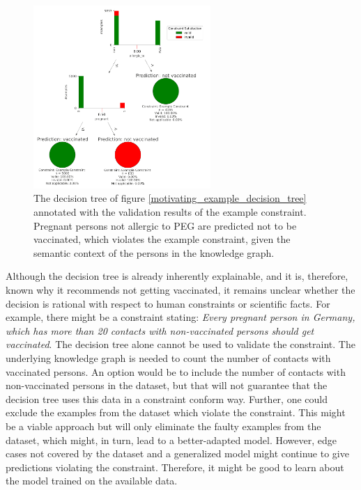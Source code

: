     \begin{figure}
            \centering
            \includegraphics[width=0.6\textwidth]{images/motivating_example/Annotated Decision Tree.png}
            \caption{The decision tree of figure \ref{motivating_example_decision_tree} annotated with the validation results of the example constraint. Pregnant persons not allergic to PEG are predicted not to be vaccinated, which violates the example constraint, given the semantic context of the persons in the knowledge graph.}
            \label{motivating_example_annotated_decision_tree}
    \end{figure}
   
   Although the decision tree is already inherently explainable, and it is, therefore, known why it recommends not getting vaccinated, it remains unclear whether the decision is rational with respect to human constraints or scientific facts. For example, there might be a constraint stating: \glqq{}\emph{Every pregnant person in Germany, which has more than 20 contacts with non-vaccinated persons should get vaccinated}\grqq{}. The decision tree alone cannot be used to validate the constraint. The underlying knowledge graph is needed to count the number of contacts with vaccinated persons. An option would be to include the number of contacts with non-vaccinated persons in the dataset, but that will not guarantee that the decision tree uses this data in a constraint conform way. 
    Further, one could exclude the examples from the dataset which violate the constraint. This might be a viable approach but will only eliminate the faulty examples from the dataset, which might, in turn, lead to a better-adapted model. However, edge cases not covered by the dataset and a generalized model might continue to give predictions violating the constraint. Therefore, it might be good to learn about the model trained on the available data.
    
